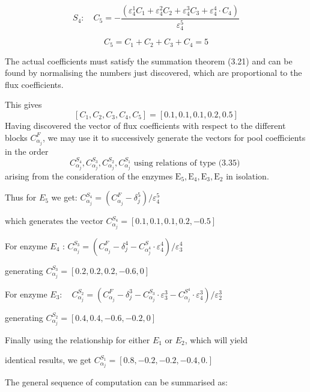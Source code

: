 $$S_{4}: \quad C_{5} = -\frac{\left(\varepsilon_{4}^{1} C_{1}+\varepsilon_{4}^{2} C_{2}+ \varepsilon_{4}^{3} C_{3}+\varepsilon_{4}^{4} \cdot C_{4}\right)}{\varepsilon_{4}^{5}}$$

$$C_{5}=C_{1}+C_{2}+C_{3} + C_{4} = 5$$

The actual coefficients must satisfy the summation theorem (3.21) and can be found by normalising the numbers just discovered, which are proportional to the flux coefficients.

This gives
%
$$
\left[C_{1}, C_{2}, C_{3}, C_{4}, C_{5}\right]=[0.1, 0.1, 0.1, 0.2, 0.5]
$$
%
Having discovered the vector of flux coefficients with respect to the different blocks $C_{\alpha_{j}}^{F}$, we may use it to successively generate the vectors for pool coefficients in the order
%
$$ C_{\alpha_{j}}^{S_4}, C_{\alpha_{j}}^{S_{3}}, C_{\alpha_{j}}^{S_{2}}, C_{\alpha_{j}}^{S_{1}} \text { using relations of type (3.35) }
$$
%
arising from the consideration of the enzymes $\mathrm{E}_{5}, \mathrm{E}_{4}, \mathrm{E}_{3}, \mathrm{E}_{2}$ in isolation.

Thus for $E_{5}$ we get: $C_{\alpha_{j}}^{S_4}=\left(C_{\alpha_{j}}^{F}-\delta_{j}^{5}\right) / \varepsilon_{4}^{5}$

$\text{which generates the vector } C_{\alpha_j}^{S_4}=[0.1, 0.1, 0.1, 0.2, -0.5]$
%

For enzyme $E_{4}$ : $
C_{\alpha_{j}}^{S_{3}}=\left(C_{\alpha_{j}}^{F}-\delta_{j}^{4}-C_{\alpha_{j}^{4}}^{S} \cdot \varepsilon_{4}^{4}\right) / \varepsilon_{3}^{4}
$

generating $ C_{\alpha_{j}}^{S_{3}}=[0.2, 0.2, 0.2, -0.6, 0] $

For enzyme $E_{3}: \quad C_{\alpha_{j}}^{S_{2}}=\left(C_{\alpha_{j}}^{F}-\delta_{j}^{3}-C_{\alpha_{j}}^{S_{3}} \cdot \varepsilon_{3}^{3}-C_{\alpha_{j}}^{S^{4}} \cdot \varepsilon_{4}^{3}\right) / \varepsilon_{2}^{3}$

generating $ C_{\alpha_{j}}^{S_{2}}=[0.4, 0.4, -0.6, -0.2, 0] $

Finally using the relationship for either $E_{1}$ or $E_{2}$, which will yield

identical results, we get $C_{\alpha_{j}}^{S_{1}}=[0.8, -0.2, -0.2, -0.4, 0.]$

The general sequence of computation can be summarised as:

